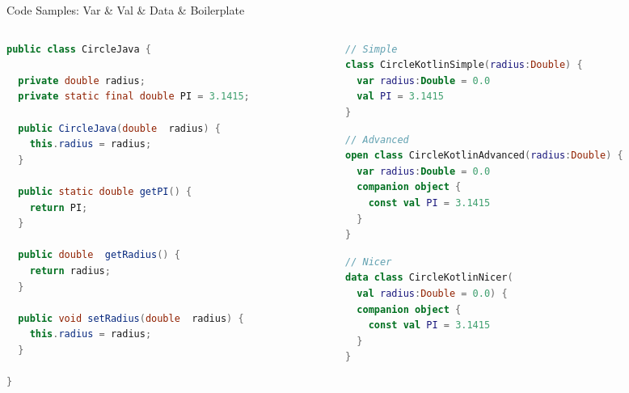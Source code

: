 \begin{frame}[fragile]{Code Samples: Var \& Val \& Data \& Boilerplate}
	\begin{columns}
		\begin{column}{0.5\textwidth}
\begin{lstlisting}[language=Java,basicstyle=\ttfamily\tiny]
public class CircleJava {

  private double radius;
  private static final double PI = 3.1415;

  public CircleJava(double  radius) {
    this.radius = radius;
  }

  public static double getPI() {
    return PI;
  }

  public double  getRadius() {
    return radius;
  }

  public void setRadius(double  radius) {
    this.radius = radius;
  }

}
\end{lstlisting}
		\end{column}
		\begin{column}{0.5\textwidth}
\begin{lstlisting}[language=Kotlin,basicstyle=\ttfamily\tiny]
// Simple
class CircleKotlinSimple(radius:Double) {
  var radius:Double = 0.0
  val PI = 3.1415
}
\end{lstlisting}
\begin{lstlisting}[language=Kotlin,basicstyle=\ttfamily\tiny]
// Advanced
open class CircleKotlinAdvanced(radius:Double) {
  var radius:Double = 0.0
  companion object {
    const val PI = 3.1415
  }
}
\end{lstlisting}
\begin{lstlisting}[language=Kotlin,basicstyle=\ttfamily\tiny]
// Nicer
data class CircleKotlinNicer(
  val radius:Double = 0.0) {
  companion object {
    const val PI = 3.1415
  }
}
\end{lstlisting}
		\end{column}
	\end{columns}
\end{frame}

